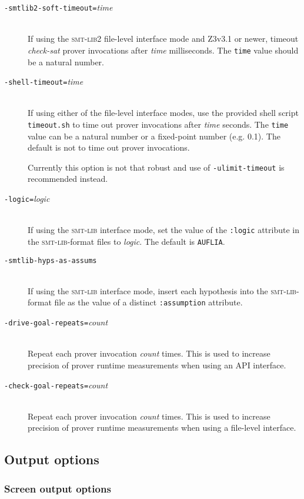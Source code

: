 \documentclass[12pt,fleqn]{article}
\newcommand{\zthree}{\textsc{Z}3}
\newcommand{\smtlib}{\textsc{smt-lib}}
\newcommand{\optionb}[1]{\item[\texttt{-{#1}}]\ \\}
\newcommand{\optionv}[2]{\item[\texttt{-{#1}=}\mdseries\textit{#2}]\ \\}
\begin{document}
\begin{description}
\optionv{smtlib2-soft-timeout}{time}
 If using the \smtlib{}2 file-level interface mode and \zthree v3.1 or newer,
 timeout \emph{check-sat} prover invocations after \emph{time} milliseconds.
 The \texttt{time} value should be a natural number.

\optionv{shell-timeout}{time}
  If using either of the file-level interface modes, 
   use the provided shell script 
   \texttt{timeout.sh} to time out prover invocations after \emph{time} 
  seconds.  The \texttt{time} value can
  be a natural number or a fixed-point number (e.g. 0.1).
  The default is not to time out prover invocations.

  Currently this option is not that robust and use of \texttt{-ulimit-timeout}
  is recommended instead.

\optionv{logic}{logic}
  If using the \smtlib{} interface mode, set the value of the 
  \texttt{:logic} attribute in the \smtlib{}-format files to \emph{logic}.
  The default is \texttt{AUFLIA}.

\optionb{smtlib-hyps-as-assums}
  If using the \smtlib{} interface mode, insert each hypothesis into
  the \smtlib{}-format file as the value of a distinct 
  \texttt{:assumption} attribute.

\optionv{drive-goal-repeats}{count}
   Repeat each prover invocation \textit{count} times.
   This is used to increase precision of prover runtime measurements when
   using an API interface.

\optionv{check-goal-repeats}{count}
   Repeat each prover invocation \textit{count} times.
   This is used to increase precision of prover runtime measurements when
   using a file-level interface.  

\end{description}

\subsection{Output options}


\subsubsection{Screen output options}
\end{document}

